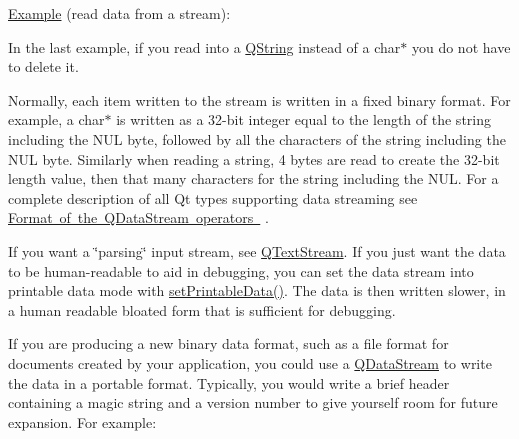 \mbox{\hyperlink{struct_example}{Example}} (read data from a stream)\+: 
\begin{DoxyCode}{0}
\end{DoxyCode}


In the last example, if you read into a \mbox{\hyperlink{class_q_string}{Q\+String}} instead of a {\ttfamily char$\ast$} you do not have to delete it.

Normally, each item written to the stream is written in a fixed binary format. For example, a {\ttfamily char$\ast$} is written as a 32-\/bit integer equal to the length of the string including the N\+UL byte, followed by all the characters of the string including the N\+UL byte. Similarly when reading a string, 4 bytes are read to create the 32-\/bit length value, then that many characters for the string including the N\+UL. For a complete description of all Qt types supporting data streaming see \mbox{\hyperlink{}{Format of the Q\+Data\+Stream operators }} .

If you want a \char`\"{}parsing\char`\"{} input stream, see \mbox{\hyperlink{class_q_text_stream}{Q\+Text\+Stream}}. If you just want the data to be human-\/readable to aid in debugging, you can set the data stream into printable data mode with \mbox{\hyperlink{class_q_data_stream_acc3df7d01950ab1a4673019f4f471e8d}{set\+Printable\+Data()}}. The data is then written slower, in a human readable bloated form that is sufficient for debugging.

If you are producing a new binary data format, such as a file format for documents created by your application, you could use a \mbox{\hyperlink{class_q_data_stream}{Q\+Data\+Stream}} to write the data in a portable format. Typically, you would write a brief header containing a magic string and a version number to give yourself room for future expansion. For example\+:


\begin{DoxyCode}{0}
\DoxyCodeLine{\textcolor{comment}{// Open the file.}}
\DoxyCodeLine{}
\DoxyCodeLine{\textcolor{comment}{// Write a header with a "magic number" and a version}}
\DoxyCodeLine{}
\DoxyCodeLine{\textcolor{comment}{// Write the data}}
\end{DoxyCode}


